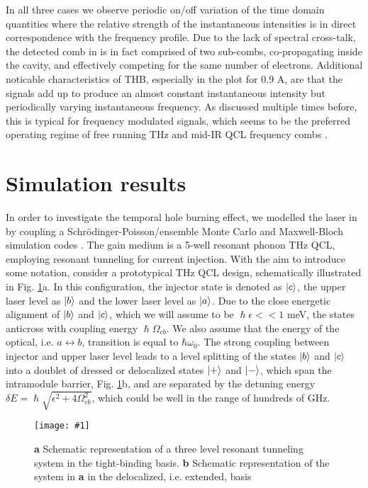 \documentclass[]{spie}  %
\newcommand{\includegraphicsXL}[1]{\texttt{[image: \#1]}}
\begin{document}
In all three cases we observe periodic on/off variation of the time domain quantities where the relative strength of the instantaneous intensities is in direct correspondence with the frequency profile. Due to the lack of spectral cross-talk, the detected comb in  is in fact comprised of two sub-combs, co-propagating inside the cavity, and effectively competing for the same number of electrons. Additional noticable characteristics of THB, especially in the plot for 0.9 A, are that the  signals add up to produce an almost constant instantaneous intensity but periodically varying instantaneous frequency. As discussed multiple times before, this is typical for frequency modulated signals, which seems to be the preferred operating regime of free running THz and mid-IR QCL frequency combs  \cite{khurgin2014coherent,hugi2013single,villares2015quantum}. 


\section{Simulation results}
In order to investigate the temporal hole burning effect, we modelled the laser in  by coupling a Schr\"odinger-Poisson/ensemble Monte Carlo and Maxwell-Bloch simulation codes \cite{petz2016}. The gain medium is a 5-well resonant phonon THz QCL, employing resonant tunneling for current injection. With the aim to introduce some notation, consider a prototypical THz QCL design, schematically illustrated in Fig. \ref{fig:basis_compare}a. In this configuration, the injector state is denoted as $\ket{c}$, the upper laser level as $\ket{b}$ and the lower laser level as $\ket{a}$. Due to the close energetic alignment of $\ket{b}$ and $\ket{c}$, which we will assume to be $\hslash\epsilon << 1$ meV, the states anticross with coupling energy 
$\hslash\Omega_{cb}$. We also assume that the energy of the optical, i.e. $a\leftrightarrow b$, transition is equal to $\hbar \omega_0$. The strong coupling between injector and upper laser level leads to a level splitting of the states $\ket{b}$ and $\ket{c}$ into a doublet of dressed or delocalized states $\ket{+}$ and $\ket{-}$, which span the intramodule barrier, Fig. \ref{fig:basis_compare}b, and are separated by the detuning energy $\delta E = \hslash\sqrt{\epsilon^2 + 4\Omega_{cb}^2}$, which could be well in the range of hundreds of GHz.  

\begin{figure}[h!]
	\begin{center}
		\includegraphicsXL{IMGS/basis_compare.eps}
		\caption{ \textbf{a} Schematic representation of a three level resonant tunneling system in the tight-binding basis. \textbf{b} Schematic representation of the system in \textbf{a} in the delocalized, i.e. extended, basis} \label{fig:basis_compare}
	\end{center}	
\end{figure}
\end{document}
